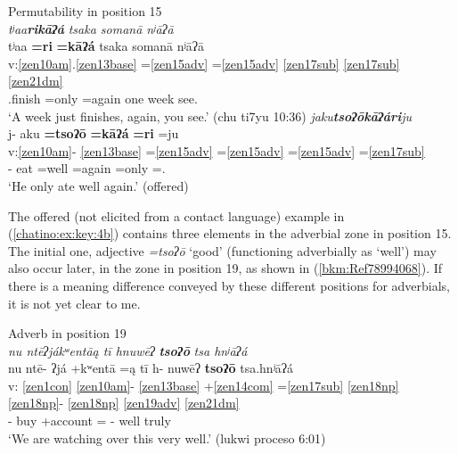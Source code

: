 \documentclass[output=paper]{langscibook}
\begin{document}
\ea\label{bkm:Ref78660310} Permutability in position 15 \\
            \ea \label{chatino:ex:key:4a}{
            \textit{tʲaa}\textbf{\textit{rikāʔá}} \textit{tsaka somanā nʲāʔā} \\ 
            \glll tʲaa \textbf{=ri} \textbf{=kāʔá} tsaka somanā nʲāʔā\\ 
            v:\ref{zen10am}.\ref{zen13base} =\ref{zen15adv} =\ref{zen15adv} \ref{zen17sub} \ref{zen17sub} \ref{zen21dm} \\
            \Pot{}.finish =only =again one week see.\Second\Sg{}\\ 
            \glt `A week just finishes, again, you see.' (chu ti7yu 10:36)
            }
            \ex\label{chatino:ex:key:4b} {
            \textit{jaku}\textbf{\textit{tsoʔōkāʔári}}\textit{ju} \\
            \glll j- aku \textbf{=tsoʔō} \textbf{=kāʔá} \textbf{=ri} =ju\\ 
              v:\ref{zen10am}- \ref{zen13base} =\ref{zen15adv} =\ref{zen15adv} =\ref{zen15adv} =\ref{zen17sub} \\ 
            \Pfv{}- eat =well =again =only =\Third\Sg{}.\M{}\\
            \glt `He only ate well again.' (offered)
            }
            \z
\z 


The offered (not elicited from a contact language) example in (\ref{chatino:ex:key:4b}) contains three elements in the adverbial zone in position 15. The initial one, adjective \textit{=tsoʔō} `good' (functioning adverbially as `well') may also occur later, in the zone in position 19, as shown in (\ref{bkm:Ref78994068}). If there is a meaning difference conveyed by these different positions for adverbials, it is not yet clear to me.


\ea\label{bkm:Ref78994068}Adverb in position 19 \\
  \textit{nu ntēʔjákʷentāą tī hnuwēʔ} \textbf{\textit{tsoʔō}} \textit{tsa hnʲāʔá}  \\
\glll {} nu ntē- ʔjá +kʷentā =ą tī h- nuwēʔ \textbf{tsoʔō} tsa.hnʲāʔá\\
v: \ref{zen1con} \ref{zen10am}{}- \ref{zen13base} +\ref{zen14com} =\ref{zen17sub} \ref{zen18np} \ref{zen18np}{}- \ref{zen18np} \ref{zen19adv} \ref{zen21dm} \\
{} \Sub{} \Prog{}- buy +account =\First\Incl{} \Tplz{} \Obj{}- \Third\Ana{} well truly\\
\glt `We are watching over this very well.' (lukwi proceso 6:01)
\z
\end{document}
